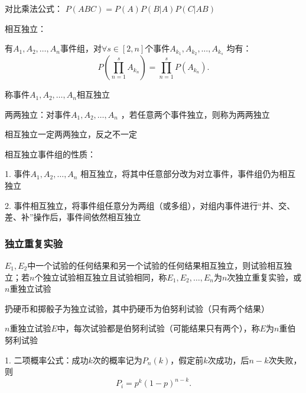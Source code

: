 对比乘法公式：
$P\left( ABC \right) =P\left( A \right) P\left( B|A \right) P\left( C|AB \right) $

\begin{defi}
    相互独立：

    有$A_1,A_2,\ldots,A_n$事件组，对$\forall s \in \left[ 2, n\right] $个事件$A_{k_1},A_{k_2},\ldots,A_{k_s}$ 均有：\[
        P\left( \prod_{n=1}^{s} A_{k_n}  \right) =\prod_{n=1}^{s} P\left( A_{k_n} \right)  
    .\] 

    称事件$A_1,A_2,\ldots,A_{n}$相互独立
\end{defi}

\begin{defi}
    两两独立：对事件$A_1,A_2,\ldots,A_n$ ，若任意两个事件独立，则称为两两独立
\end{defi}

\begin{notation}
    相互独立一定两两独立，反之不一定
\end{notation}

\begin{notation}
    相互独立事件组的性质：

    1. 事件$A_1,A_2,\ldots,A_n$ 相互独立，将其中任意部分改为对立事件，事件组仍为相互独立

    2. 事件相互独立，将事件组任意分为两组（或多组），对组内事件进行“并、交、差、补”操作后，事件间依然相互独立
\end{notation}
\subsubsection*{独立重复实验}%
\label{subsub:独立重复实验}
\begin{defi}
    $E_1,E_2$中一个试验的任何结果和另一个试验的任何结果相互独立，则试验相互独立；若$n$个独立试验相互独立且试验相同，称$E_1,E_2,\ldots,E_n$为$n$次独立重复实验，或$n$重独立试验

    \begin{eg}
        扔硬币和掷骰子为独立试验，其中扔硬币为伯努利试验（只有两个结果）
    \end{eg}
    
\end{defi}
\begin{defi}
    $n$重独立试验$E$中，每次试验都是伯努利试验（可能结果只有两个），称$E$为$n$重伯努利试验
\end{defi}
    1. 二项概率公式：成功$k$次的概率记为$P_n\left( k \right) $，假定前$k$次成功，后$n-k$次失败，则\[
        P_i =p^k\left( 1-p \right) ^{n-k}
    .\] 

